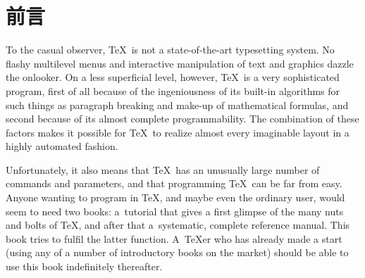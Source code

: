 \documentclass[letterpaper]{book}
\begin{document}
\chapter*{前言}
To the casual observer, \TeX\
is not a state-of-the-art typesetting system.
No flashy multilevel menus and interactive manipulation
of text and graphics dazzle the onlooker.
On a less superficial level, however, \TeX\ is a very sophisticated
program, first of all because of the ingeniousness of its
built-in algorithms for such things as paragraph breaking
and make-up of mathematical formulas, and
second because of its almost complete programmability.
The combination of these factors makes it possible for \TeX\
to realize almost every imaginable layout in a highly automated
fashion.

Unfortunately, it also means that \TeX\ has an
unusually large number of commands and parameters,
and that programming \TeX\ can be far from easy.
Anyone wanting to program in \TeX, and maybe
even the ordinary user, would seem to need two books:
a~tutorial that gives a first glimpse of the many
nuts and bolts of \TeX, and after that
a~systematic, complete reference manual.
This book tries to fulfil the latter function.
A~\TeX er who has already made a start
(using any of a number of introductory books
on the market)
should be able to use this book indefinitely thereafter.
\end{document}
